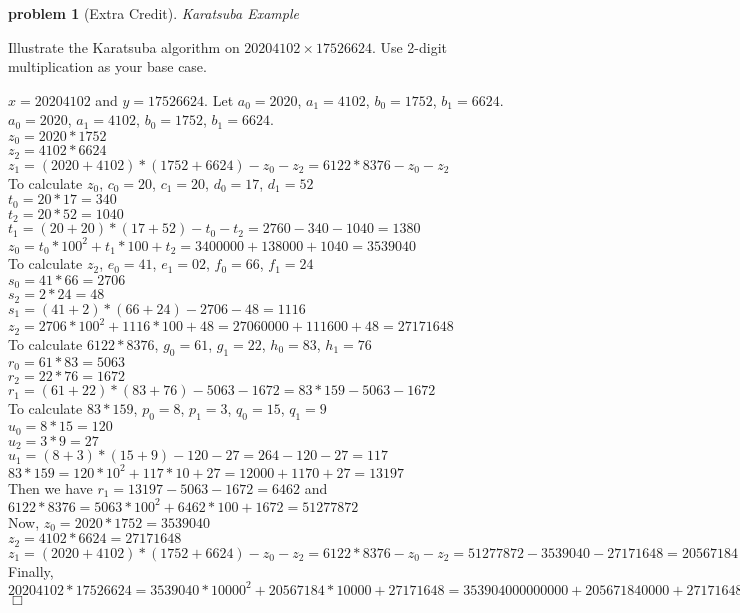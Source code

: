 \documentclass[10pt]{article}
\newenvironment{proof}{\par\noindent{\it Proof.}\hspace*{1em}}{$\Box$\bigskip}
\newtheorem{problem}{\sc\color{cit}problem}
\begin{document}
\begin{problem} [Extra Credit] Karatsuba Example \end{problem}
Illustrate the Karatsuba algorithm on $20204102 \times 17526624$. Use 2-digit multiplication as your base case.
\begin{proof}

$x=20204102$ and $y=17526624$. Let $a_0=2020$, $a_1=4102$, $b_0=1752$, $b_1=6624$.\\
$a_0=2020$, $a_1=4102$, $b_0=1752$, $b_1=6624$.\\
$z_0=2020*1752$\\
$z_2=4102*6624$\\
$z_1=(2020+4102)*(1752+6624)-z_0-z_2=6122*8376-z_0-z_2$\\

To calculate $z_0$, $c_0=20$, $c_1=20$, $d_0=17$, $d_1=52$\\
$t_0=20*17=340$\\
$t_2=20*52=1040$\\
$t_1=(20+20)*(17+52)-t_0-t_2=2760-340-1040=1380$\\
$z_0=t_0*100^2+t_1*100+t_2=3400000+138000+1040=3539040$\\

To calculate $z_2$, $e_0=41$, $e_1=02$, $f_0=66$, $f_1=24$\\
$s_0=41*66=2706$\\
$s_2=2*24=48$\\
$s_1=(41+2)*(66+24)-2706-48=1116$\\
$z_2=2706*100^2+1116*100+48=27060000+111600+48=27171648$\\

To calculate $6122*8376$, $g_0=61$, $g_1=22$, $h_0=83$, $h_1=76$\\
$r_0=61*83=5063$\\
$r_2=22*76=1672$\\
$r_1=(61+22)*(83+76)-5063-1672=83*159-5063-1672$\\

To calculate $83*159$, $p_0=8$, $p_1=3$, $q_0=15$, $q_1=9$\\
$u_0=8*15=120$\\
$u_2=3*9=27$\\
$u_1=(8+3)*(15+9)-120-27=264-120-27=117$\\
$83*159 = 120*10^2+117*10+27=12000+1170+27=13197$\\

Then we have $r_1=13197-5063-1672=6462$ and $6122*8376 = 5063*100^2+6462*100+1672=51277872$\\

Now, $z_0=2020*1752 = 3539040$\\
$z_2=4102*6624=27171648$\\
$z_1=(2020+4102)*(1752+6624)-z_0-z_2=6122*8376-z_0-z_2=51277872-3539040-27171648=20567184$\\
Finally, $20204102*17526624=3539040*10000^2+20567184*10000+27171648=353904000000000+205671840000+27171648=354109699011648$\\


\end{proof}


%
%
\end{document}

